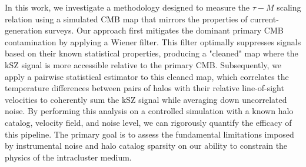 \documentclass[]{article}
\begin{document}
In this work, we investigate a methodology designed to measure the $\tau-M$ scaling relation using a simulated CMB map that mirrors the properties of current-generation surveys. Our approach first mitigates the dominant primary CMB contamination by applying a Wiener filter. This filter optimally suppresses signals based on their known statistical properties, producing a "cleaned" map where the kSZ signal is more accessible relative to the primary CMB. Subsequently, we apply a pairwise statistical estimator to this cleaned map, which correlates the temperature differences between pairs of halos with their relative line-of-sight velocities to coherently sum the kSZ signal while averaging down uncorrelated noise. By performing this analysis on a controlled simulation with a known halo catalog, velocity field, and noise level, we can rigorously quantify the efficacy of this pipeline. The primary goal is to assess the fundamental limitations imposed by instrumental noise and halo catalog sparsity on our ability to constrain the physics of the intracluster medium.
\end{document}
